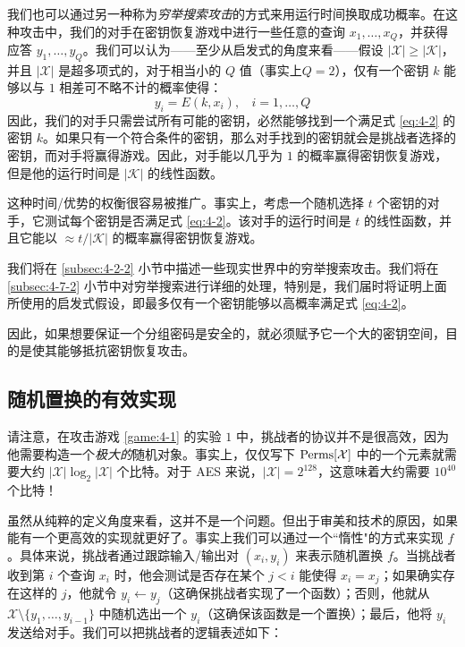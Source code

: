 我们也可以通过另一种称为\emph{穷举搜索攻击}的方式来用运行时间换取成功概率。在这种攻击中，我们的对手在密钥恢复游戏中进行一些任意的查询 $x_1,\dots,x_Q$，并获得应答 $y_1,\dots,y_Q$。我们可以认为——至少从启发式的角度来看——假设 $|\mathcal{X}|\geq|\mathcal{K}|$，并且 $|\mathcal{X}|$ 是超多项式的，对于相当小的 $Q$ 值（事实上$Q=2$），仅有一个密钥 $k$ 能够以与 $1$ 相差可不略不计的概率使得：
\begin{equation}\label{eq:4-2}
y_i=E(k,x_i),~~~~
i=1,\dots,Q
\end{equation}
因此，我们的对手只需尝试所有可能的密钥，必然能够找到一个满足式 \ref{eq:4-2} 的密钥 $k$。如果只有一个符合条件的密钥，那么对手找到的密钥就会是挑战者选择的密钥，而对手将赢得游戏。因此，对手能以几乎为 $1$ 的概率赢得密钥恢复游戏，但是他的运行时间是 $|\mathcal{K}|$ 的线性函数。

这种时间/优势的权衡很容易被推广。事实上，考虑一个随机选择 $t$ 个密钥的对手，它测试每个密钥是否满足式 \ref{eq:4-2}。该对手的运行时间是 $t$ 的线性函数，并且它能以 $\approx{t}/{|\mathcal{K}|}$ 的概率赢得密钥恢复游戏。

我们将在 \ref{subsec:4-2-2} 小节中描述一些现实世界中的穷举搜索攻击。我们将在 \ref{subsec:4-7-2} 小节中对穷举搜索进行详细的处理，特别是，我们届时将证明上面所使用的启发式假设，即最多仅有一个密钥能够以高概率满足式 \ref{eq:4-2}。

因此，如果想要保证一个分组密码是安全的，就必须赋予它一个大的密钥空间，目的是使其能够抵抗密钥恢复攻击。

\subsection{随机置换的有效实现}\label{subsec:4-1-2}

请注意，在攻击游戏 \ref{game:4-1} 的实验 $1$ 中，挑战者的协议并不是很高效，因为他需要构造一个\emph{极大的}随机对象。事实上，仅仅写下 ${\rm Perms}[\mathcal{X}]$ 中的一个元素就需要大约 $|\mathcal{X}|\log_2|\mathcal{X}|$ 个比特。对于 AES 来说，$|\mathcal{X}|=2^{128}$，这意味着大约需要 $10^{40}$ 个比特！

虽然从纯粹的定义角度来看，这并不是一个问题。但出于审美和技术的原因，如果能有一个更高效的实现就更好了。事实上我们可以通过一个``惰性"的方式来实现 $f$。具体来说，挑战者通过跟踪输入/输出对 $(x_i,y_i)$ 来表示随机置换 $f$。当挑战者收到第 $i$ 个查询 $x_i$ 时，他会测试是否存在某个 $j<i$ 能使得 $x_i=x_j$；如果确实存在这样的 $j$，他就令 $y_i\leftarrow y_j$（这确保挑战者实现了一个函数）；否则，他就从 $\mathcal{X}\setminus\{y_1,\dots,y_{i-1}\}$ 中随机选出一个 $y_i$（这确保该函数是一个置换）；最后，他将 $y_i$ 发送给对手。我们可以把挑战者的逻辑表述如下：

